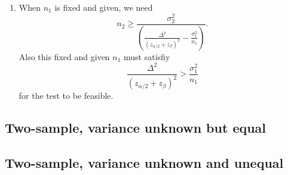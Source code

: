 \documentclass[a4paper,12pt]{article}
\begin{document}
\begin{enumerate}
\item When $n_1$ is fixed and given, we need
  \[
    n_2 \geq
    \frac{
      \sigma_2^2
    }{
      \left(
        \frac{\Delta^2}{
          \left(
            z_{\alpha / 2} + z_{\beta}
          \right)^2
        }
        - \frac{\sigma_1^2}{n_1}
      \right)
    }
    .
  \]
  Also this fixed and given $n_1$ must satisfiy
  \[
    \frac{\Delta^2}{
      \left(
        z_{\alpha / 2} + z_{\beta}
      \right)^2
    }
    >
    \frac{\sigma_1^2}{n_1}
  \]
  for the test to be feasible.
\end{enumerate}

\subsection{Two-sample, variance unknown but equal}
\label{sec:two-sample-variance-1}

\subsection{Two-sample, variance unknown and unequal}
\label{sec:two-sample-variance-2}
\end{document}
